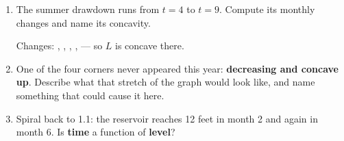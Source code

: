 \documentclass[10pt]{article}
\begin{document}
\vspace{0.1in}

\boxguard[24]
\begin{tcolorbox}[colback=white, colframe=black!40,
    title=\textbf{Tier E --- Extension},
    fonttitle=\bfseries, arc=2mm, left=3mm, right=3mm, top=2mm, bottom=2mm]

\begin{enumerate}[itemsep=8pt]
  \item The summer drawdown runs from $t = 4$ to $t = 9$. Compute its monthly
        changes and name its concavity.

        \vspace{0.05in}
        Changes: \blank{1cm}, \blank{1cm}, \blank{1cm}, \blank{1cm},
        \blank{1cm} \quad --- so $L$ is concave \blank{1.4cm} there.

        \vspace{0.05in}

  \item One of the four corners never appeared this year: \textbf{decreasing
        and concave up}. Describe what that stretch of the graph would look
        like, and name something that could cause it here.

        \vspace{0.05in}

  \item Spiral back to 1.1: the reservoir reaches 12 feet in month 2 and again
        in month 6. Is \textbf{time} a function of \textbf{level}?

        \vspace{0.05in}
\end{enumerate}
\end{tcolorbox}
\end{document}
